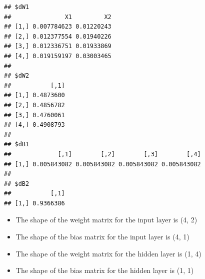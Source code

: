 \begin{Shaded}
\begin{Highlighting}[]
\OtherTok{\textless{}{-}} \NormalTok{(}\SpecialCharTok{\%*\%} \NormalTok{(}\SpecialCharTok{*}\SpecialCharTok{{-}}
  
\OtherTok{\textless{}{-}} \SpecialCharTok{\%*\%} \SpecialCharTok{\%*\%} \NormalTok{(}\SpecialCharTok{*} \SpecialCharTok{*}\SpecialCharTok{{-}}
  
\OtherTok{\textless{}{-}} \NormalTok{(} \OtherTok{=}
                      \OtherTok{=}
                      \OtherTok{=}
                      \OtherTok{=}
  
    
\NormalTok{\}}

\OtherTok{\textless{}{-}} 
\end{Highlighting}
\end{Shaded}

\begin{verbatim}
## $dW1
##               X1         X2
## [1,] 0.007784623 0.01220243
## [2,] 0.012377554 0.01940226
## [3,] 0.012336751 0.01933869
## [4,] 0.019159197 0.03003465
## 
## $dW2
##           [,1]
## [1,] 0.4873600
## [2,] 0.4856782
## [3,] 0.4760061
## [4,] 0.4908793
## 
## $dB1
##             [,1]        [,2]        [,3]        [,4]
## [1,] 0.005843082 0.005843082 0.005843082 0.005843082
## 
## $dB2
##           [,1]
## [1,] 0.9366386
\end{verbatim}

\begin{itemize}
\tightlist
\item
  The shape of the weight matrix for the input layer is (4, 2)
\item
  The shape of the bias matrix for the input layer is (4, 1)
\item
  The shape of the weight matrix for the hidden layer is (1, 4)
\item
  The shape of the bias matrix for the hidden layer is (1, 1)
\end{itemize}

